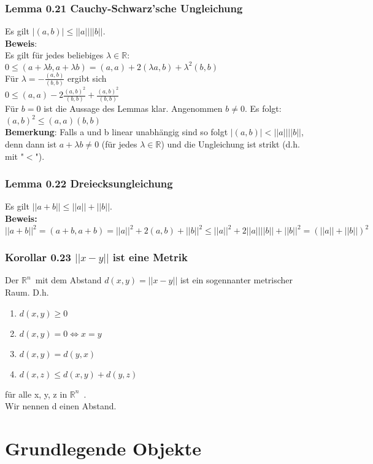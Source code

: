 \documentclass{article}
\newcommand{\lb}{\lambda}
\newcommand{\R}{\mathbb{R}}
\newcommand{\mRn}{$\mathbb{R}^n$\ }
\begin{document}
\subsubsection{Lemma 0.21 Cauchy-Schwarz'sche Ungleichung}
Es gilt $|(a, b)| \le ||a||||b||$.\\
\textbf{Beweis}:\\
Es gilt für jedes beliebiges $\lb \in \R$:\\
$0 \le (a + \lb b, a + \lb b) = (a, a) + 2 (\lb a, b) + \lb^2 (b, b)$\\
Für $\lb = -\frac{(a,b)}{(b, b)}$ ergibt sich\\
$0 \le (a, a) - 2 \frac{(a, b)^2}{(b, b)} + \frac{(a, b)^2}{(b, b)}$\\
Für $b = 0$ ist die Aussage des Lemmas klar. Angenommen $b \neq 0$. Es folgt:\\
$(a,b)^2 \le (a, a)(b,b)$\\
\textbf{Bemerkung}: Falls a und b linear unabhängig sind so folgt $|(a,b)| < ||a||||b||$, denn dann ist $a + \lb b \neq 0$ (für jedes $\lb \in \R$) und die Ungleichung ist strikt (d.h. mit "$<$").

\subsubsection{Lemma 0.22 Dreiecksungleichung}
Es gilt $||a+b|| \le ||a|| + ||b||$.\\
\textbf{Beweis:}\\
$ ||a+b||^2 = (a+b, a+b)= ||a||^2 + 2(a,b) + ||b||^2 \le ||a||^2 + 2 ||a||||b|| + ||b||^2 = (||a|| + ||b||)^2$

\subsubsection{Korollar 0.23 $||x-y||$ ist eine Metrik}
Der \mRn mit dem Abstand $d(x, y) = ||x - y||$ ist ein sogennanter metrischer Raum. D.h.
\begin{enumerate}
\item{
$d(x, y) \ge 0$}
\item{$d(x, y) = 0 \Leftrightarrow x = y$}
\item{$d(x, y) = d(y, x)$}
\item{$d(x, z) \le d(x,y) + d(y,z)$}
\end{enumerate}
für alle x, y, z in \mRn.\\
Wir nennen d einen Abstand.

\section{Grundlegende Objekte}
\end{document}

